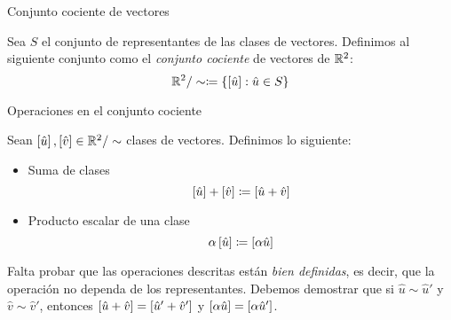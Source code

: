     \begin{frame}{Conjunto cociente de vectores}
        \begin{mdefinition}
            Sea $S$ el conjunto de representantes de las clases de vectores. Definimos al siguiente conjunto como el \emph{conjunto cociente} de vectores de $\rmath[2]$:
            \[\rmath[2]/\sim\coloneqq\set{\bracket{\hat{u}}:\hat{u}\in S}\]
        \end{mdefinition}
    \end{frame}
    \begin{frame}{Operaciones en el conjunto cociente}
        \begin{mdefinition}
            Sean $\bracket{\hat{u}},\bracket{\hat{v}}\in\rmath[2]/\sim$ clases de vectores. Definimos lo siguiente:
            \begin{itemize}
                \item Suma de clases
                \[\bracket{\hat{u}} +\bracket{\hat{v}}\coloneqq\bracket{\hat{u} +\hat{v}}\]
                \item Producto escalar de una clase
                \[\alpha\bracket{\hat{u}}\coloneqq\bracket{\alpha\hat{u}}\]
            \end{itemize}
        \end{mdefinition}
    \end{frame}
    \begin{frame}{}
        Falta probar que las operaciones descritas están \emph{bien definidas}, es decir, que la operación no dependa de los representantes. Debemos demostrar que si $\hat{u}\sim\hat{u}'$ y $\hat{v}\sim\hat{v}'$, entonces $\bracket{\hat{u} +\hat{v}} =\bracket{\hat{u}' +\hat{v}'}$ y $\bracket{\alpha\hat{u}} =\bracket{\alpha\hat{u}'}$.
    \end{frame}
